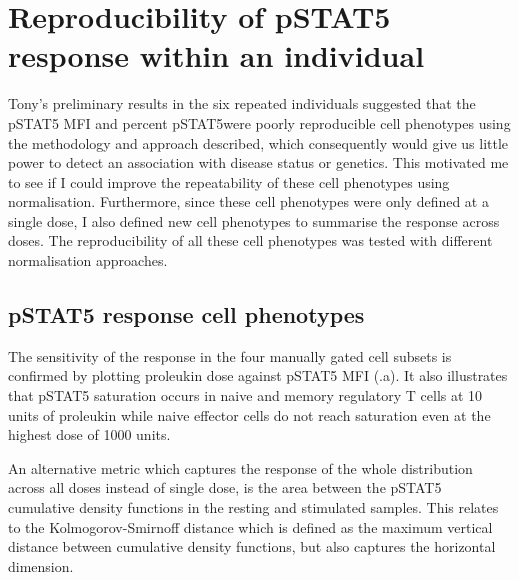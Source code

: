\section{Reproducibility of pSTAT5 response within an individual}

Tony's preliminary results in the six repeated individuals suggested that the pSTAT5 MFI and percent pSTAT5\positive were poorly reproducible
cell phenotypes using the methodology and approach described, which consequently would give us little power to detect an association with disease status or genetics.
This motivated me to see if I could improve the repeatability of these cell phenotypes using normalisation.
Furthermore, since these cell phenotypes were only defined at a single dose,
I also defined new cell phenotypes to summarise the response across doses.
The reproducibility of all these cell phenotypes was tested with different normalisation approaches.


\subsection{pSTAT5 response cell phenotypes}

The sensitivity of the response in the four manually gated cell subsets is confirmed by plotting proleukin dose against pSTAT5 MFI (.a).
It also illustrates that pSTAT5 saturation occurs in naive and memory regulatory T cells at 10 units of proleukin while naive effector cells do not reach
saturation even at the highest dose of 1000 units.


An alternative metric which captures the response of the whole distribution across all doses instead of single dose, 
is the area between the pSTAT5 cumulative density functions in the resting and stimulated samples.
This relates to the Kolmogorov-Smirnoff distance which is defined as the maximum vertical distance between cumulative density functions,
but also captures the horizontal dimension.


